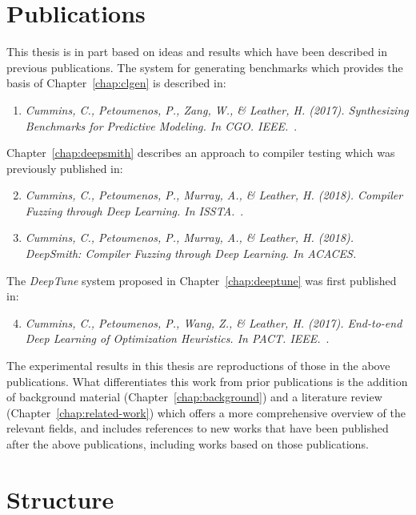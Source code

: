 \begin{itemize}
\end{itemize}

\newpage
\section{Publications}

This thesis is in part based on ideas and results which have been described in previous publications. The system for generating benchmarks which provides the basis of Chapter~\ref{chap:clgen} is described in:
\begin{enumerate}
	\item \emph{Cummins, C., Petoumenos, P., Zang, W., \& Leather, H. (2017). Synthesizing Benchmarks for Predictive Modeling. In CGO. IEEE.}~\cite{Cummins2017a}.
\end{enumerate}

\noindent
Chapter~\ref{chap:deepsmith} describes an approach to compiler testing which was previously published in:
\begin{enumerate}
	\setcounter{enumi}{1}
	\item \emph{Cummins, C., Petoumenos, P., Murray, A., \& Leather, H. (2018). Compiler Fuzzing through Deep Learning. In ISSTA.}~\cite{Cummins2017a}.
	\item \emph{Cummins, C., Petoumenos, P., Murray, A., \& Leather, H. (2018). DeepSmith: Compiler Fuzzing through Deep Learning. In ACACES.~\cite{Cummins2018a}}
\end{enumerate}

\noindent
The \emph{DeepTune} system proposed in Chapter~\ref{chap:deeptune} was first published in:
\begin{enumerate}
	\setcounter{enumi}{3}
	\item \emph{Cummins, C., Petoumenos, P., Wang, Z., \& Leather, H. (2017). End-to-end Deep Learning of Optimization Heuristics. In PACT. IEEE.}~\cite{Cummins2017b}.
\end{enumerate}

The experimental results in this thesis are reproductions of those in the above publications. What differentiates this work from prior publications is the addition of background material (Chapter~\ref{chap:background}) and a literature review (Chapter~\ref{chap:related-work}) which offers a more comprehensive overview of the relevant fields, and includes references to new works that have been published after the above publications, including works based on those publications.


\section{Structure}

